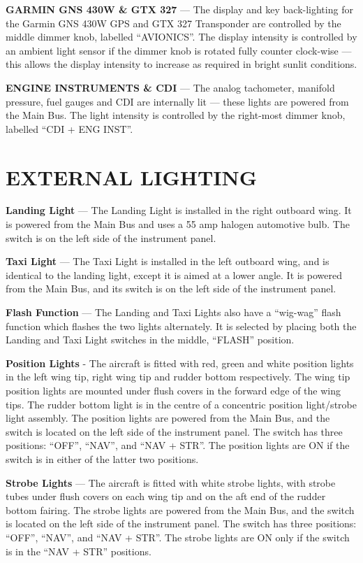 \textbf{GARMIN GNS 430W \& GTX 327} --- The display and key back-lighting for the Garmin GNS 430W GPS and GTX 327 Transponder are controlled by the middle dimmer knob, labelled ``AVIONICS''. The display intensity is controlled by an ambient light sensor if the dimmer knob is rotated fully counter clock-wise --- this allows the display intensity to increase as required in bright sunlit conditions.

\textbf{ENGINE INSTRUMENTS \& CDI} --- The analog tachometer, manifold pressure, fuel gauges and CDI are internally lit --- these lights are powered from the Main Bus. The light intensity is controlled by the right-most dimmer knob, labelled ``CDI + ENG INST''. 

\section{EXTERNAL LIGHTING}

\textbf{Landing Light} --- The Landing Light is installed in the right outboard wing. It is powered from the Main Bus and uses a 55 amp halogen automotive bulb. The switch is on the left side of the instrument panel. 

\textbf{Taxi Light} --- The Taxi Light is installed in the left outboard wing, and is identical to the landing light, except it is aimed at a lower angle. It is powered from the Main Bus, and its switch is on the left side of the instrument panel.

\textbf{Flash Function} --- The Landing and Taxi Lights also have a ``wig-wag'' flash function which flashes the two lights alternately. It is selected by placing both the Landing and Taxi Light switches in the middle, ``FLASH'' position.

\textbf{Position Lights }- The aircraft is fitted with red, green and white position lights in the left wing tip, right wing tip and rudder bottom respectively. The wing tip position lights are mounted under flush covers in the forward edge of the wing tips. The rudder bottom light is in the centre of a concentric position light/strobe light assembly. The position lights are powered from the Main Bus, and the switch is located on the left side of the instrument panel. The switch has three positions: ``OFF'', ``NAV'', and ``NAV + STR''. The position lights are ON if the switch is in either of the latter two positions.

\textbf{Strobe Lights} --- The aircraft is fitted with white strobe lights, with strobe tubes under flush covers on each wing tip and on the aft end of the rudder bottom fairing. The strobe lights are powered from the Main Bus, and the switch is located on the left side of the instrument panel. The switch has three positions: ``OFF'', ``NAV'', and ``NAV + STR''. The strobe lights are ON only if the switch is in the ``NAV + STR'' positions.


